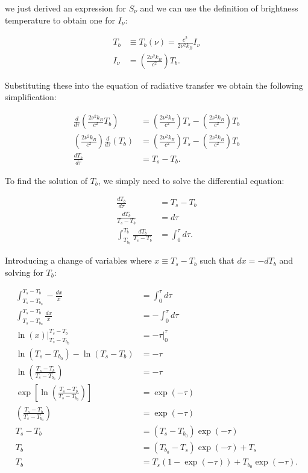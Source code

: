 \documentclass[12pt]{article}
\begin{document}
we just derived an expression for $S_\nu$ and we can use the definition of brightness temperature to obtain one for $I_\nu$:

\begin{equation*}
\begin{split}
T_b &\equiv T_b(\nu) = \frac{c^2}{2\nu^2k_B}I_\nu\\
I_\nu &= \left(\frac{2\nu^2k_B}{c^2}\right)T_b.
\end{split}
\end{equation*}

Substituting these into the equation of radiative transfer we obtain the following simplification:

\begin{equation*}
\begin{split}
\frac{d}{d\tau}\left(\frac{2\nu^2k_B}{c^2}T_b\right) &= \left(\frac{2\nu^2k_B}{c^2}\right)T_s - \left(\frac{2\nu^2k_B}{c^2}\right)T_b\\
\left(\frac{2\nu^2k_B}{c^2}\right) \frac{d}{d\tau}\left(T_b\right) &= \left(\frac{2\nu^2k_B}{c^2}\right)T_s - \left(\frac{2\nu^2k_B}{c^2}\right)T_b\\
\frac{dT_b}{d\tau} &= T_s - T_b.
\end{split}
\end{equation*}

To find the solution of $T_b$, we simply need to solve the differential equation:

\begin{equation*}
\begin{split}
\frac{dT_b}{d\tau} &= T_s - T_b\\
\frac{dT_b}{T_s - T_b} &= d\tau\\
\int_{T_{b_0}}^{T_b}\frac{dT_b}{T_s - T_b} &= \int_0^{\tau} d\tau.
\end{split}
\end{equation*}

Introducing a change of variables where $x \equiv T_s - T_b$ such that $dx=-dT_b$ and solving for $T_b$:

\begin{equation*}
\begin{split}
\int_{T_s-T_{b_0}}^{T_s-T_b}-\frac{dx}{x} &= \int_0^{\tau} d\tau\\
\int_{T_s-T_{b_0}}^{T_s-T_b}\frac{dx}{x} &= -\int_0^{\tau} d\tau\\
\ln(x)\rvert_{T_s-T_{b_0}}^{T_s-T_b} &= -\tau\rvert_0^{\tau}\\
\ln(T_s-T_{b_0}) - \ln(T_s-T_b) &= -\tau\\
\ln\left(\frac{T_s-T_b}{T_s-T_{b_0}}\right) &= -\tau\\
\exp\left[\ln\left(\frac{T_s-T_b}{T_s-T_{b_0}}\right)\right] &= \exp(-\tau)\\
\left(\frac{T_s-T_b}{T_s-T_{b_0}}\right) &= \exp(-\tau)\\
T_s-T_b &= (T_s-T_{b_0})\exp(-\tau)\\
T_b &= (T_{b_0}-T_s)\exp(-\tau) + T_s\\
T_b &= T_s(1-\exp(-\tau)) + T_{b_0}\exp(-\tau).
\end{split}
\end{equation*}
\end{document}
